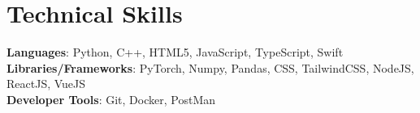 \documentclass[letterpaper,11pt]{article}
\begin{document}
\section{Technical Skills}
 \begin{itemize}[leftmargin=0.15in, label={}]
    \small{\item{   
     \textbf{Languages}{: Python, C++, HTML5, JavaScript, TypeScript, Swift} \\[1mm]
     \textbf{Libraries/Frameworks}{: PyTorch, Numpy, Pandas, CSS, TailwindCSS, NodeJS, ReactJS, VueJS} \\ [1mm]
     \textbf{Developer Tools}{: Git, Docker, PostMan} \\[1mm]

    }}
 \end{itemize}
 \vspace{-16pt}
 \vspace{3pt}
\vspace{10pt}

\vspace{-15pt}
\end{document}
